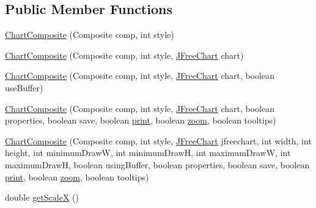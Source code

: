 \subsection*{Public Member Functions}
\begin{DoxyCompactItemize}
\item 
\mbox{\hyperlink{classorg_1_1jfree_1_1experimental_1_1chart_1_1swt_1_1_chart_composite_a231c3eb3b023cc4b230788640361f5b4}{Chart\+Composite}} (Composite comp, int style)
\item 
\mbox{\hyperlink{classorg_1_1jfree_1_1experimental_1_1chart_1_1swt_1_1_chart_composite_ae006da3e28b683c1a0758e1981ea337d}{Chart\+Composite}} (Composite comp, int style, \mbox{\hyperlink{classorg_1_1jfree_1_1chart_1_1_j_free_chart}{J\+Free\+Chart}} chart)
\item 
\mbox{\hyperlink{classorg_1_1jfree_1_1experimental_1_1chart_1_1swt_1_1_chart_composite_ab4445bdd307cbafaf28ec714c6136c89}{Chart\+Composite}} (Composite comp, int style, \mbox{\hyperlink{classorg_1_1jfree_1_1chart_1_1_j_free_chart}{J\+Free\+Chart}} chart, boolean use\+Buffer)
\item 
\mbox{\hyperlink{classorg_1_1jfree_1_1experimental_1_1chart_1_1swt_1_1_chart_composite_ad6ce0b36f96fa76f1f0671d6a29f6f8b}{Chart\+Composite}} (Composite comp, int style, \mbox{\hyperlink{classorg_1_1jfree_1_1chart_1_1_j_free_chart}{J\+Free\+Chart}} chart, boolean properties, boolean save, boolean \mbox{\hyperlink{classorg_1_1jfree_1_1experimental_1_1chart_1_1swt_1_1_chart_composite_a059b7aaa0b6cd3b9270e50e51966ec94}{print}}, boolean \mbox{\hyperlink{classorg_1_1jfree_1_1experimental_1_1chart_1_1swt_1_1_chart_composite_a333608aa2d2a3bc356c79c5bac9462ec}{zoom}}, boolean tooltips)
\item 
\mbox{\hyperlink{classorg_1_1jfree_1_1experimental_1_1chart_1_1swt_1_1_chart_composite_ab9546b501ad29226e8123bfe8b26a9f4}{Chart\+Composite}} (Composite comp, int style, \mbox{\hyperlink{classorg_1_1jfree_1_1chart_1_1_j_free_chart}{J\+Free\+Chart}} jfreechart, int width, int height, int minimum\+DrawW, int minimum\+DrawH, int maximum\+DrawW, int maximum\+DrawH, boolean using\+Buffer, boolean properties, boolean save, boolean \mbox{\hyperlink{classorg_1_1jfree_1_1experimental_1_1chart_1_1swt_1_1_chart_composite_a059b7aaa0b6cd3b9270e50e51966ec94}{print}}, boolean \mbox{\hyperlink{classorg_1_1jfree_1_1experimental_1_1chart_1_1swt_1_1_chart_composite_a333608aa2d2a3bc356c79c5bac9462ec}{zoom}}, boolean tooltips)
\item 
double \mbox{\hyperlink{classorg_1_1jfree_1_1experimental_1_1chart_1_1swt_1_1_chart_composite_ac6d931219a01a08e9b276cb2415dd246}{get\+ScaleX}} ()

\end{DoxyCompactItemize}

